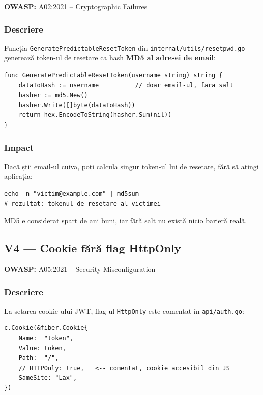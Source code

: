 \documentclass[12pt]{article}
\begin{document}
\textbf{OWASP:} A02:2021 -- Cryptographic Failures

\subsubsection*{Descriere}

Funcția \texttt{GeneratePredictableResetToken} din \texttt{internal/utils/resetpwd.go}
generează token-ul de resetare ca hash \textbf{MD5 al adresei de email}:

\begin{verbatim}
func GeneratePredictableResetToken(username string) string {
    dataToHash := username          // doar email-ul, fara salt
    hasher := md5.New()
    hasher.Write([]byte(dataToHash))
    return hex.EncodeToString(hasher.Sum(nil))
}
\end{verbatim}

\subsubsection*{Impact}

Dacă știi email-ul cuiva, poți calcula singur token-ul lui de resetare, fără să atingi aplicația:

\begin{verbatim}
echo -n "victim@example.com" | md5sum
# rezultat: tokenul de resetare al victimei
\end{verbatim}

MD5 e considerat spart de ani buni, iar fără salt nu există nicio barieră reală.

\subsection{V4 --- Cookie fără flag HttpOnly}

\textbf{OWASP:} A05:2021 -- Security Misconfiguration

\subsubsection*{Descriere}

La setarea cookie-ului JWT, flag-ul \texttt{HttpOnly} este comentat în
\texttt{api/auth.go}:

\begin{verbatim}
c.Cookie(&fiber.Cookie{
    Name:  "token",
    Value: token,
    Path:  "/",
    // HTTPOnly: true,   <-- comentat, cookie accesibil din JS
    SameSite: "Lax",
})
\end{verbatim}
\end{document}
